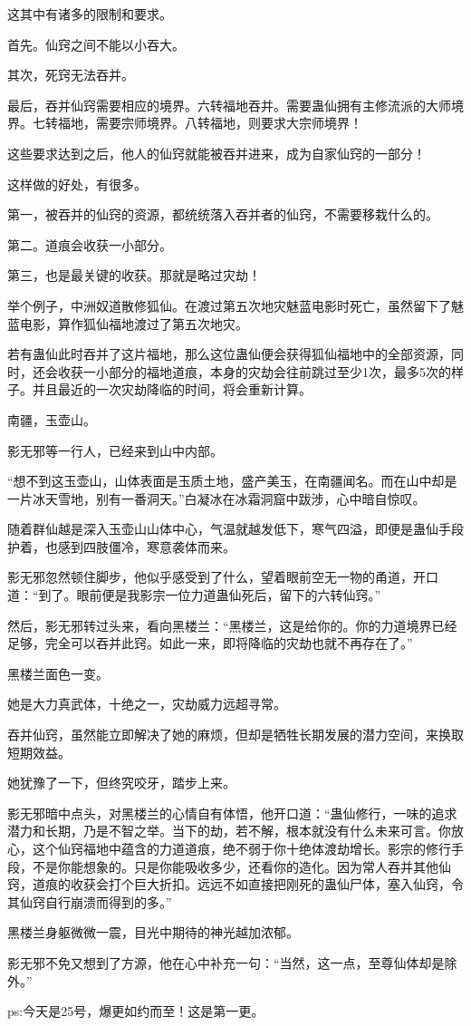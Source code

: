 \begin{this_body}
这其中有诸多的限制和要求。

首先。仙窍之间不能以小吞大。

其次，死窍无法吞并。

最后，吞并仙窍需要相应的境界。六转福地吞并。需要蛊仙拥有主修流派的大师境界。七转福地，需要宗师境界。八转福地，则要求大宗师境界！

这些要求达到之后，他人的仙窍就能被吞并进来，成为自家仙窍的一部分！

这样做的好处，有很多。

第一，被吞并的仙窍的资源，都统统落入吞并者的仙窍，不需要移栽什么的。

第二。道痕会收获一小部分。

第三，也是最关键的收获。那就是略过灾劫！

举个例子，中洲奴道散修狐仙。在渡过第五次地灾魅蓝电影时死亡，虽然留下了魅蓝电影，算作狐仙福地渡过了第五次地灾。

若有蛊仙此时吞并了这片福地，那么这位蛊仙便会获得狐仙福地中的全部资源，同时，还会收获一小部分的福地道痕，本身的灾劫会往前跳过至少1次，最多5次的样子。并且最近的一次灾劫降临的时间，将会重新计算。

南疆，玉壶山。

影无邪等一行人，已经来到山中内部。

“想不到这玉壶山，山体表面是玉质土地，盛产美玉，在南疆闻名。而在山中却是一片冰天雪地，别有一番洞天。”白凝冰在冰霜洞窟中跋涉，心中暗自惊叹。

随着群仙越是深入玉壶山山体中心，气温就越发低下，寒气四溢，即便是蛊仙手段护着，也感到四肢僵冷，寒意袭体而来。

影无邪忽然顿住脚步，他似乎感受到了什么，望着眼前空无一物的甬道，开口道：“到了。眼前便是我影宗一位力道蛊仙死后，留下的六转仙窍。”

然后，影无邪转过头来，看向黑楼兰：“黑楼兰，这是给你的。你的力道境界已经足够，完全可以吞并此窍。如此一来，即将降临的灾劫也就不再存在了。”

黑楼兰面色一变。

她是大力真武体，十绝之一，灾劫威力远超寻常。

吞并仙窍，虽然能立即解决了她的麻烦，但却是牺牲长期发展的潜力空间，来换取短期效益。

她犹豫了一下，但终究咬牙，踏步上来。

影无邪暗中点头，对黑楼兰的心情自有体悟，他开口道：“蛊仙修行，一味的追求潜力和长期，乃是不智之举。当下的劫，若不解，根本就没有什么未来可言。你放心，这个仙窍福地中蕴含的力道道痕，绝不弱于你十绝体渡劫增长。影宗的修行手段，不是你能想象的。只是你能吸收多少，还看你的造化。因为常人吞并其他仙窍，道痕的收获会打个巨大折扣。远远不如直接把刚死的蛊仙尸体，塞入仙窍，令其仙窍自行崩溃而得到的多。”

黑楼兰身躯微微一震，目光中期待的神光越加浓郁。

影无邪不免又想到了方源，他在心中补充一句：“当然，这一点，至尊仙体却是除外。”

ps:今天是25号，爆更如约而至！这是第一更。

\end{this_body}

